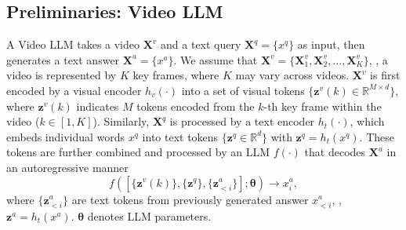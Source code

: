 

\subsection{Preliminaries: Video LLM}
A Video LLM takes a video $\mathbf{X}^v$ and a text query $\mathbf{X}^q=\{x^q\}$ as input, then generates a text answer $\mathbf{X}^a=\{x^a\}$. We assume that $\mathbf{X}^v = \{\mathbf{X}^v_1, \mathbf{X}^v_2, ..., \mathbf{X}^v_K\}$, \ie, a video is represented by $K$ key frames, where $K$ may vary across videos. $\mathbf{X}^v$ is first encoded by a visual encoder
$h_v(\cdot)$ into a set of visual tokens $\{\mathbf{z}^v(k) \in \mathbb{R}^{M \times d}\}$, where $\mathbf{z}^v(k)$ indicates $M$ tokens encoded from the $k$-th key frame within the video ($k \in [1, K]$). Similarly, $\mathbf{X}^q$ is processed by a text encoder $h_t(\cdot)$, which embeds individual words $x^q$ into text tokens $\{\mathbf{z}^q \in \mathbb{R}^d\}$ with $\mathbf{z}^q = h_t(x^q) $. 
These tokens are further combined and processed by an LLM $f(\cdot)$ that decodes $\mathbf{X}^a$ in an autoregressive manner
\begin{equation}
    f\left( \left[ \{\mathbf{z}^v(k)\}, \{\mathbf{z}^q\}, \{\mathbf{z}^a_{<i}\} \right]; \mathbf{\theta} \right) \rightarrow x_i^a, \label{eq:llm}
\end{equation}
where $\{\mathbf{z}^a_{<i}\}$ are text tokens from previously generated answer $x^a_{<i}$, \ie, $\mathbf{z}^a = h_t(x^a)$. $\mathbf{\theta}$ denotes LLM parameters. 

